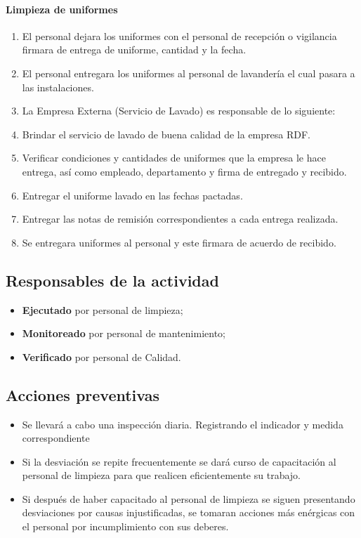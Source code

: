 \paragraph{Limpieza de uniformes}
\begin{enumerate}
	\item El personal dejara los uniformes con el personal de recepción o vigilancia firmara de entrega de uniforme, cantidad y la fecha.
	\item El personal entregara los uniformes al personal de lavandería el cual pasara a las instalaciones.
	\item La Empresa Externa (Servicio de Lavado) es responsable de lo siguiente:
	\item Brindar el servicio de lavado de buena calidad de la empresa \gls{RDF}.
	\item Verificar condiciones y cantidades de uniformes que la empresa le hace entrega, así como empleado, departamento y firma de entregado y recibido.
	\item Entregar el uniforme lavado en las fechas pactadas.
	\item Entregar las notas de remisión correspondientes a cada entrega realizada.
	\item Se entregara uniformes al personal y este firmara de acuerdo de recibido.
\end{enumerate}

\subsection{Responsables de la actividad}

\begin{itemize}
	\item \textbf{Ejecutado} por personal de limpieza;
	\item \textbf{Monitoreado} por personal de mantenimiento;
	\item \textbf{Verificado} por personal de Calidad.
\end{itemize}

\subsection{Acciones preventivas}

\begin{itemize}
	\item Se llevará a cabo una inspección diaria. Registrando el indicador y medida correspondiente
	\item Si la desviación se repite frecuentemente se dará curso de capacitación al personal de limpieza para que realicen eficientemente su trabajo.
	\item Si después de haber capacitado al personal de limpieza se siguen presentando desviaciones por causas injustificadas, se tomaran acciones más enérgicas con el personal por incumplimiento con sus deberes.
\end{itemize}

